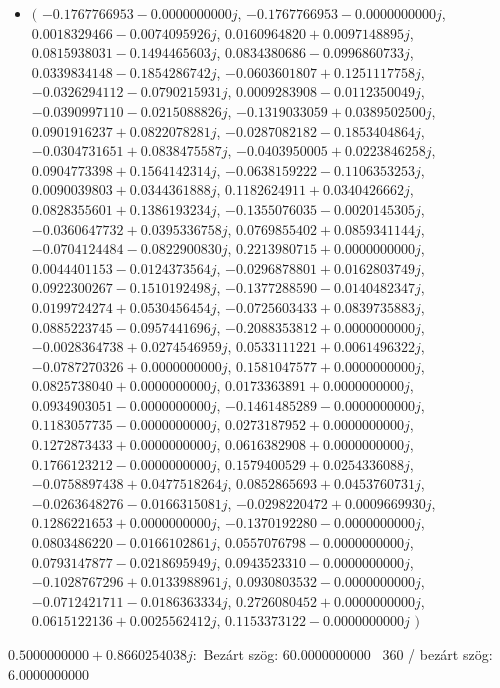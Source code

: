 \documentclass[14pt,a4paper]{article}
\begin{document}
\begin{itemize}
\item
$\big($
$-0.1767766953-0.0000000000j$, $-0.1767766953-0.0000000000j$, $0.0018329466-0.0074095926j$, $0.0160964820+0.0097148895j$, $0.0815938031-0.1494465603j$, $0.0834380686-0.0996860733j$, $0.0339834148-0.1854286742j$, $-0.0603601807+0.1251117758j$, $-0.0326294112-0.0790215931j$, $0.0009283908-0.0112350049j$, $-0.0390997110-0.0215088826j$, $-0.1319033059+0.0389502500j$, $0.0901916237+0.0822078281j$, $-0.0287082182-0.1853404864j$, $-0.0304731651+0.0838475587j$, $-0.0403950005+0.0223846258j$, $0.0904773398+0.1564142314j$, $-0.0638159222-0.1106353253j$, $0.0090039803+0.0344361888j$, $0.1182624911+0.0340426662j$, $0.0828355601+0.1386193234j$, $-0.1355076035-0.0020145305j$, $-0.0360647732+0.0395336758j$, $0.0769855402+0.0859341144j$, $-0.0704124484-0.0822900830j$, $0.2213980715+0.0000000000j$, $0.0044401153-0.0124373564j$, $-0.0296878801+0.0162803749j$, $0.0922300267-0.1510192498j$, $-0.1377288590-0.0140482347j$, $0.0199724274+0.0530456454j$, $-0.0725603433+0.0839735883j$, $0.0885223745-0.0957441696j$, $-0.2088353812+0.0000000000j$, $-0.0028364738+0.0274546959j$, $0.0533111221+0.0061496322j$, $-0.0787270326+0.0000000000j$, $0.1581047577+0.0000000000j$, $0.0825738040+0.0000000000j$, $0.0173363891+0.0000000000j$, $0.0934903051-0.0000000000j$, $-0.1461485289-0.0000000000j$, $0.1183057735-0.0000000000j$, $0.0273187952+0.0000000000j$, $0.1272873433+0.0000000000j$, $0.0616382908+0.0000000000j$, $0.1766123212-0.0000000000j$, $0.1579400529+0.0254336088j$, $-0.0758897438+0.0477518264j$, $0.0852865693+0.0453760731j$, $-0.0263648276-0.0166315081j$, $-0.0298220472+0.0009669930j$, $0.1286221653+0.0000000000j$, $-0.1370192280-0.0000000000j$, $0.0803486220-0.0166102861j$, $0.0557076798-0.0000000000j$, $0.0793147877-0.0218695949j$, $0.0943523310-0.0000000000j$, $-0.1028767296+0.0133988961j$, $0.0930803532-0.0000000000j$, $-0.0712421711-0.0186363334j$, $0.2726080452+0.0000000000j$, $0.0615122136+0.0025562412j$, $0.1153373122-0.0000000000j$
$\big)$
\end{itemize}
$0.5000000000+0.8660254038j$:\
Bezárt szög: $60.0000000000$ \
360 / bezárt szög: $6.0000000000$\
\end{document}
